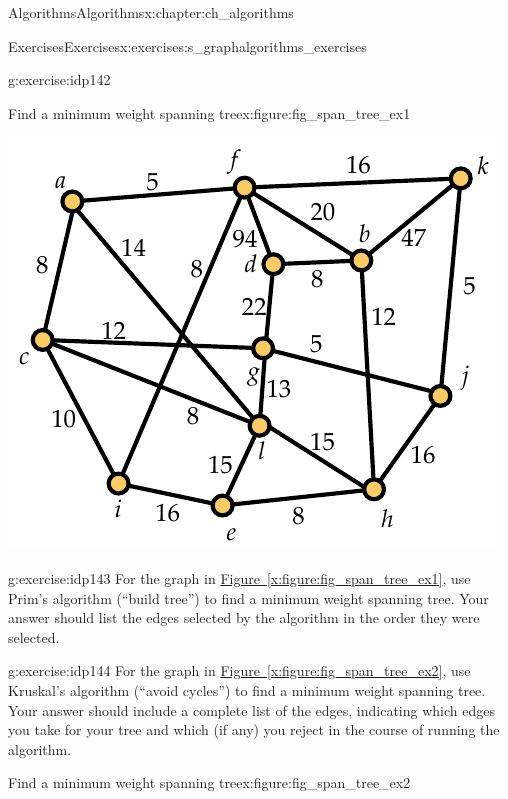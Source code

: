 \documentclass[oneside,10pt,]{book}
\newcommand{\xreffont}{\relax}
\numberwithin{equation}{section}
\begin{document}
\begin{chapterptx}{Algorithms}{}{Algorithms}{}{}{x:chapter:ch_algorithms}
\begin{exercises-section}{Exercises}{}{Exercises}{}{}{x:exercises:s_graphalgorithms_exercises}
\begin{divisionexercise}{1}{}{}{g:exercise:idp142}
\begin{figureptx}{Find a minimum weight spanning tree}{x:figure:fig_span_tree_ex1}{}
\begin{image}{0.175}{0.65}{0.175}
\includegraphics[width=\linewidth]{images/span_tree_ex1}
\end{image}%
\tcblower
\end{figureptx}%
\end{divisionexercise}%
\begin{divisionexercise}{2}{}{}{g:exercise:idp143}%
For the graph in \hyperref[x:figure:fig_span_tree_ex1]{Figure~{\xreffont\ref{x:figure:fig_span_tree_ex1}}}, use Prim's algorithm (``build tree'') to find a minimum weight spanning tree. Your answer should list the edges selected by the algorithm in the order they were selected.%
\end{divisionexercise}%
\begin{divisionexercise}{3}{}{}{g:exercise:idp144}%
For the graph in \hyperref[x:figure:fig_span_tree_ex2]{Figure~{\xreffont\ref{x:figure:fig_span_tree_ex2}}}, use Kruskal's algorithm (``avoid cycles'') to find a minimum weight spanning tree. Your answer should include a complete list of the edges, indicating which edges you take for your tree and which (if any) you reject in the course of running the algorithm.%
\begin{figureptx}{Find a minimum weight spanning tree}{x:figure:fig_span_tree_ex2}{}%
\begin{image}{0.175}{0.65}{0.175}%

\end{image}
\end{figureptx}
\end{divisionexercise}
\end{exercises-section}
\end{chapterptx}
\end{document}
